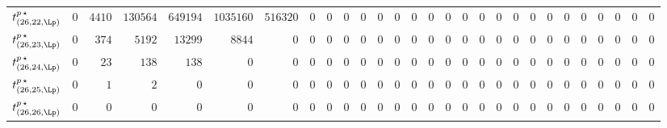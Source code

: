 \begin{tabular}{r|rrrrrrrrrrrrrrrrrrrrrrrrrrr}
  $t^{p \, \star}_{(26,22,\Lp)}$ & $0$ & $4410$ & $130564$ & $649194$ & $1035160$ & $516320$ & $0$ & $0$ & $0$ & $0$ & $0$ & $0$ & $0$ & $0$ & $0$ & $0$ & $0$ & $0$ & $0$ & $0$ & $0$ & $0$ & $0$ & $0$ & $0$ & $0$ & $0$ \\
  $t^{p \, \star}_{(26,23,\Lp)}$ & $0$ & $374$ & $5192$ & $13299$ & $8844$ & $0$ & $0$ & $0$ & $0$ & $0$ & $0$ & $0$ & $0$ & $0$ & $0$ & $0$ & $0$ & $0$ & $0$ & $0$ & $0$ & $0$ & $0$ & $0$ & $0$ & $0$ & $0$ \\
  $t^{p \, \star}_{(26,24,\Lp)}$ & $0$ & $23$ & $138$ & $138$ & $0$ & $0$ & $0$ & $0$ & $0$ & $0$ & $0$ & $0$ & $0$ & $0$ & $0$ & $0$ & $0$ & $0$ & $0$ & $0$ & $0$ & $0$ & $0$ & $0$ & $0$ & $0$ & $0$ \\
  $t^{p \, \star}_{(26,25,\Lp)}$ & $0$ & $1$ & $2$ & $0$ & $0$ & $0$ & $0$ & $0$ & $0$ & $0$ & $0$ & $0$ & $0$ & $0$ & $0$ & $0$ & $0$ & $0$ & $0$ & $0$ & $0$ & $0$ & $0$ & $0$ & $0$ & $0$ & $0$ \\
  $t^{p \, \star}_{(26,26,\Lp)}$ & $0$ & $0$ & $0$ & $0$ & $0$ & $0$ & $0$ & $0$ & $0$ & $0$ & $0$ & $0$ & $0$ & $0$ & $0$ & $0$ & $0$ & $0$ & $0$ & $0$ & $0$ & $0$ & $0$ & $0$ & $0$ & $0$ & $0$ \\
\end{tabular}
